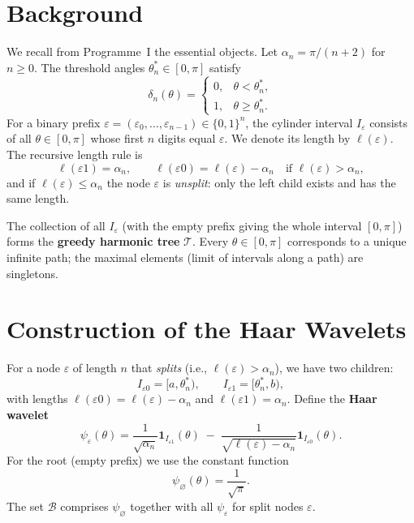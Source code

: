 \documentclass[11pt,a4paper]{article}
\begin{document}
\section{Background}
We recall from Programme~I the essential objects.  Let \(\alpha_n = \pi/(n+2)\) for \(n\ge 0\).  The threshold angles \(\theta_n^*\in[0,\pi]\) satisfy
\[
\delta_n(\theta) =
\begin{cases}
0, & \theta < \theta_n^*,\\
1, & \theta \ge \theta_n^*.
\end{cases}
\]
For a binary prefix \(\varepsilon = (\varepsilon_0,\dots,\varepsilon_{n-1})\in\{0,1\}^n\), the cylinder interval \(I_\varepsilon\) consists of all \(\theta\in[0,\pi]\) whose first \(n\) digits equal \(\varepsilon\).  We denote its length by \(\ell(\varepsilon)\).  The recursive length rule is
\[
\ell(\varepsilon1) = \alpha_n,\qquad \ell(\varepsilon0) = \ell(\varepsilon) - \alpha_n \quad\text{if }\ell(\varepsilon) > \alpha_n,
\]
and if \(\ell(\varepsilon) \le \alpha_n\) the node \(\varepsilon\) is \emph{unsplit}: only the left child exists and has the same length.

The collection of all \(I_\varepsilon\) (with the empty prefix giving the whole interval \([0,\pi]\)) forms the \textbf{greedy harmonic tree} \(\mathcal{T}\).  Every \(\theta\in[0,\pi]\) corresponds to a unique infinite path; the maximal elements (limit of intervals along a path) are singletons.

\section{Construction of the Haar Wavelets}
For a node \(\varepsilon\) of length \(n\) that \emph{splits} (i.e., \(\ell(\varepsilon) > \alpha_n\)), we have two children:
\[
I_{\varepsilon0} = [a, \theta_n^*),\qquad I_{\varepsilon1} = [\theta_n^*, b),
\]
with lengths \(\ell(\varepsilon0) = \ell(\varepsilon)-\alpha_n\) and \(\ell(\varepsilon1) = \alpha_n\).  Define the \textbf{Haar wavelet}
\begin{equation}\label{eq:wavelet}
\psi_\varepsilon(\theta) =
\frac{1}{\sqrt{\alpha_n}}\mathbf{1}_{I_{\varepsilon1}}(\theta) \;-\;
\frac{1}{\sqrt{\ell(\varepsilon)-\alpha_n}}\mathbf{1}_{I_{\varepsilon0}}(\theta).
\end{equation}
For the root (empty prefix) we use the constant function
\[
\psi_\varnothing(\theta) = \frac{1}{\sqrt{\pi}}.
\]
The set \(\mathcal{B}\) comprises \(\psi_\varnothing\) together with all \(\psi_\varepsilon\) for split nodes \(\varepsilon\).
\end{document}
